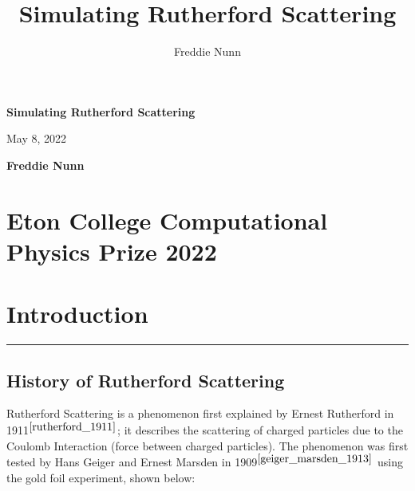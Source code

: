 \documentclass[11pt]{article}
\title{Simulating Rutherford Scattering}
\author{Freddie Nunn}
\begin{document}
    	\begin{titlepage}
		\begin{center}
			\vspace*{1cm}
			
			\Huge
			\textbf{Simulating Rutherford Scattering}
			
			\vspace{0.5cm}
			\LARGE
			May 8, 2022
			
			\vspace{1.5cm}
			
			\textbf{Freddie Nunn}
			
			\vfill
			
			
			\vspace{0.8cm}
			
			\hypertarget{eton-college-computational-physics-prize-2022}{%
			\section*{Eton College Computational Physics Prize 2022}\label{eton-college-computational-physics-prize-2022}}
			
			
		\end{center}
	\end{titlepage}
    
	\pagebreak
	\begingroup
	\color{black}
	\tableofcontents
	\endgroup
	\pagebreak

 \hypertarget{introduction}{%
\section{Introduction}\label{introduction}}

\begin{center}\rule{0.5\linewidth}{0.5pt}\end{center}

\hypertarget{history-of-rutherford-scattering}{%
\subsection{History of Rutherford
Scattering}\label{history-of-rutherford-scattering}}

Rutherford Scattering is a phenomenon first explained by Ernest
Rutherford in 1911$^{\cite{rutherford_1911}}$; it describes the scattering of charged particles due
to the Coulomb Interaction (force between charged particles). The
phenomenon was first tested by Hans Geiger and Ernest Marsden in 1909$^{\cite{geiger_marsden_1913}}$
using the gold foil experiment, shown below:
\end{document}
